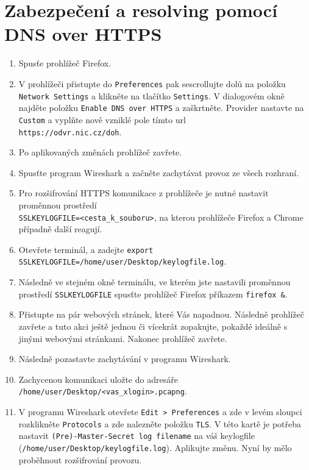 \newpage
\section{Zabezpečení a resolving pomocí DNS over HTTPS}
\begin{enumerate}
    \item Spusťe prohlížeč Firefox.
    \item V prohlížeči přistupte do \texttt{Preferences} pak sescrollujte dolů na položku \texttt{Network Settings} a klikněte na tlačítko \texttt{Settings}. V dialogovém okně najděte položku \texttt{Enable DNS over HTTPS} a zaškrtněte. Provider nastavte na \texttt{Custom} a vyplňte nově vzniklé pole tímto url\\ \texttt{https://odvr.nic.cz/doh}.
    \item Po aplikovaných změnách prohlížeč zavřete.
    \item Spusťte program Wireshark a začněte zachytávat provoz ze všech rozhraní.
    \item Pro rozšifrování HTTPS komunikace z prohlížeče je nutné nastavit proměnnou prostředí\\ \texttt{SSLKEYLOGFILE=<cesta\_k\_souboru>}, na kterou prohlížeče Firefox a Chrome případně další reagují.
    \item Otevřete terminál, a zadejte \texttt{export SSLKEYLOGFILE=/home/user/Desktop/keylogfile.log}.
    \item Následně ve stejném okně terminálu, ve kterém jste nastavili proměnnou prostředí \texttt{SSLKEYLOGFILE} spusťte prohlížeč Firefox příkazem \texttt{firefox \&}.
    \item Přistupte na pár webových stránek, které Vás napadnou. Následně prohlížeč zavřete a tuto akci ještě jednou či vícekrát zopakujte, pokaždé ideálně s jinými webovými stránkami. Nakonec prohlížeč zavřete.
    \item Následně pozastavte zachytávání v programu Wireshark.
    \item Zachycenou komunikaci uložte do adresáře \texttt{/home/user/Desktop/<vas\_xlogin>.pcapng}.
    \item V programu Wireshark otevřete \texttt{Edit > Preferences} a zde v levém sloupci rozklikněte \texttt{Protocols} a zde nalezněte položku \texttt{TLS}. V této kartě je potřeba nastavit \texttt{(Pre)-Master-Secret log filename} na váš keylogfile (\texttt{/home/user/Desktop/keylogfile.log}). Aplikujte změnu. Nyní by mělo proběhnout rozšifrování provozu.

\end{enumerate}
